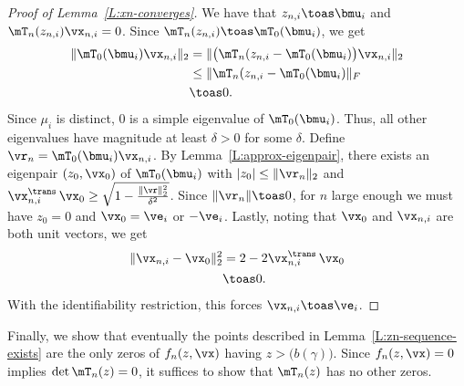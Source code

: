 \begin{proof}[Proof of Lemma~\ref{L:xn-converges}]
    We have that $z_{n,i} \toas \bmu_i$ and 
    $\mT_n(z_{n,i}) \vx_{n,i} = 0$.  Since
    $\mT_n(z_{n,i}) \toas \mT_0(\bmu_i)$, we get
    \begin{align*}
        \| \mT_0(\bmu_i) \vx_{n,i} \|_2
            &= \| \big(\mT_n(z_{n,i} - \mT_0(\bmu_i) \big) \vx_{n,i} \|_2 \\
            &\leq \| \mT_n(z_{n,i} - \mT_0(\bmu_i) \|_F \\
            &\toas 0.
    \end{align*}
    Since $\mu_i$ is distinct, $0$ is a simple eigenvalue of $\mT_0(\bmu_i)$.
    Thus, all other eigenvalues have magnitude at least $\delta > 0$ for some 
    $\delta$.
    Define $\vr_n = \mT_0(\bmu_i) \vx_{n,i}$.  By 
    Lemma~\ref{L:approx-eigenpair}, there exists an eigenpair $(z_0, \vx_0)$
    of $\mT_0(\bmu_i)$ with $| z_0 | \leq \| \vr_n \|_2$ and
    $ \vx_{n,i}^\trans \, \vx_0 \geq
        \sqrt{ 1 - \frac{\|\vr\|_2^2}{ \delta^2 } }$.  Since 
    $\|\vr_n\| \toas 0$, for $n$ large enough we must have $z_0 = 0$ and
    $\vx_0 = \ve_i$ or $-\ve_i$.  Lastly, noting that $\vx_0$ and $\vx_{n,i}$
    are both unit vectors, we get
    \begin{align*}
        \| \vx_{n,i} - \vx_0 \|_2^2
            &= 2 - 2 \vx_{n,i}^\trans \, \vx_0 \\
            &\toas 0.
    \end{align*}
    With the identifiability restriction, this forces $\vx_{n,i} \toas \ve_i$.
\end{proof}

Finally, we show that eventually the points described in Lemma~\ref{L:zn-sequence-exists} are the only zeros of $f_n(z, \vx)$ having
$z > \big( b(\gamma) \big)$.  Since $f_n(z, \vx) = 0$ implies 
$\det \mT_n(z) = 0$, it suffices to show that $\mT_n(z)$ has no other
zeros.

